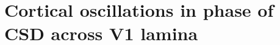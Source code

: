 \chapter{Cortical oscillations in phase of CSD across V1 lamina}
\label{ch:plam}

\graphicspath{{Chapters/laminar-phase/figs/}}

